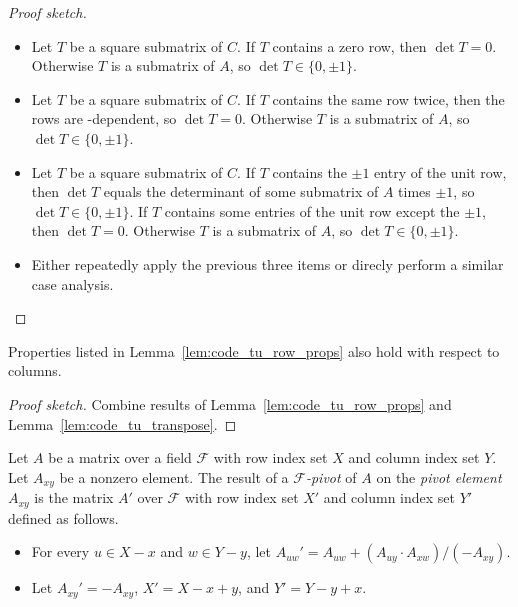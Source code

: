\begin{proof}[Proof sketch]
  \begin{itemize}
    \item Let $T$ be a square submatrix of $C$. If $T$ contains a zero row, then $\det T = 0$. Otherwise $T$ is a submatrix of $A$, so $\det T \in \{0, \pm 1\}$.
    \item Let $T$ be a square submatrix of $C$. If $T$ contains the same row twice, then the rows are \GFtwo-dependent, so $\det T = 0$. Otherwise $T$ is a submatrix of $A$, so $\det T \in \{0, \pm 1\}$.
    \item Let $T$ be a square submatrix of $C$. If $T$ contains the $\pm 1$ entry of the unit row, then $\det T$ equals the determinant of some submatrix of $A$ times $\pm 1$, so $\det T \in \{0, \pm 1\}$. If $T$ contains some entries of the unit row except the $\pm 1$, then $\det T = 0$. Otherwise $T$ is a submatrix of $A$, so $\det T \in \{0, \pm 1\}$.
    \item Either repeatedly apply the previous three items or direcly perform a similar case analysis.
  \end{itemize}
\end{proof}

\begin{corollary}
  \label{cor:code_tu_col_props}
  Properties listed in Lemma~\ref{lem:code_tu_row_props} also hold with respect to columns.
\end{corollary}

\begin{proof}[Proof sketch]
  Combine results of Lemma~\ref{lem:code_tu_row_props} and Lemma~\ref{lem:code_tu_transpose}.
\end{proof}

\begin{definition}
  \label{def:code_pivot}
  Let $A$ be a matrix over a field $\mathcal{F}$ with row index set $X$ and column index set $Y$.
  Let $A_{xy}$ be a nonzero element.
  The result of a \emph{$\mathcal{F}$-pivot} of $A$ on the \emph{pivot element} $A_{xy}$
  is the matrix $A'$ over $\mathcal{F}$ with row index set $X'$ and column index set $Y'$ defined as follows.
  \begin{itemize}
    \item For every $u \in X - x$ and $w \in Y - y$, let $A_{uw}' = A_{uw} + (A_{uy} \cdot A_{xw}) / (-A_{xy})$.
    \item Let $A_{xy}' = -A_{xy}$, $X' = X - x + y$, and $Y' = Y - y + x$.
  \end{itemize}
\end{definition}

